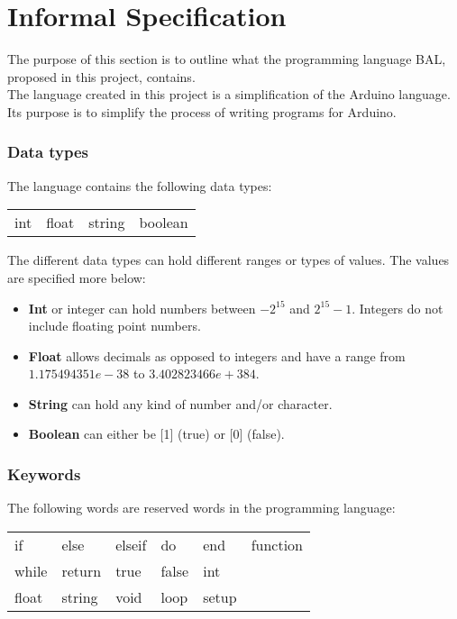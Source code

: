 \chapter{Informal Specification}\label{analysis:informal-specification}
The purpose of this section is to outline what the programming language BAL, proposed in this project, contains.
\\The language created in this project is a simplification of the Arduino language. Its purpose is to simplify the process of writing programs for Arduino.   

\subsection{Data types}
The language contains the following data types: \\ 
\begin{center}
\begin{tabular}{ l l l l}
int & float & string & boolean \\
\end{tabular}
\end{center}

The different data types can hold different ranges or types of values. The values are specified more below: 
\begin{itemize}
\item \textbf{Int} or integer can hold numbers between $-2^{15}$ and $2^{15}-1$. Integers do not include floating point numbers.
\item \textbf{Float} allows decimals as opposed to integers and have a range from $1.175494351e-38$ to $3.402823466e+384$.
\item \textbf{String} can hold any kind of number and/or character. 
\item \textbf{Boolean} can either be [1] (true) or [0] (false). 
\end{itemize}

\subsection{Keywords}
The following words are reserved words in the programming language:\\ 
\begin{center}
\begin{tabular}{ l l l l l l}
if & else & elseif & do & end & function \\
while & return & true & false & int \\
float & string & void & loop & setup \\
\end{tabular}
\end{center}


